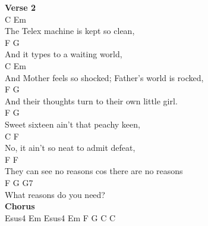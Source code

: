 \documentclass[a4paper]{article}
\begin{document}
{{        }
        \textbf{Verse 2}
        ~\\
        {
            \cutive
            \obeyspaces
    C                Em
\\
The Telex machine is kept so clean, 
\\
       F                  G
\\
And it types to a waiting world,
\\
           C                          Em
\\
And Mother feels so shocked; Father's world is rocked,
\\
          F                      G
\\
And their thoughts turn to their own little girl.
\\
F                        G
\\
Sweet sixteen ain't that peachy keen,
\\
       C                   F
\\
No, it ain't so neat to admit defeat,
\\
         F                        F
\\
They can see no reasons cos there are no reasons
\\
     F              G   G7
\\
What reasons do you need? 
\\

        }
        \textbf{Chorus}
        ~\\
        {
            \cutive
            \obeyspaces
Esus4  Em  Esus4  Em  F  G  C   C
\\

}}
\end{document}
